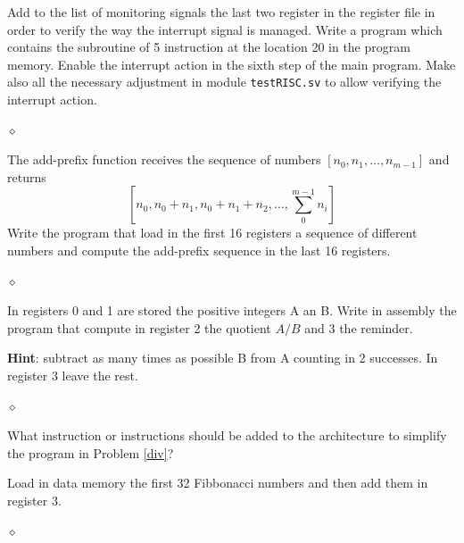 \begin{problem}
Add to the list of monitoring signals the last two register in the register file in order to verify the way the interrupt signal is managed. Write a program which contains the subroutine of 5 instruction at the location 20 in the program memory. Enable the interrupt action in the sixth step of the main program. Make also all the necessary adjustment in module {\tt testRISC.sv} to allow verifying the interrupt action.

$\diamond$
\end{problem}


\begin{problem}
The add-prefix function receives the sequence of numbers $[n_0, n_1, \ldots, n_{m-1}]$ and returns $$[n_0, n_0 + n_1, n_0 + n_1 + n_2, \ldots, \sum_0^{m-1} n_i]$$
Write the program that load in the first 16 registers a sequence of different numbers and compute the add-prefix sequence in the last 16 registers.

$\diamond$
\end{problem}


\begin{problem}\label{div}
In registers 0 and 1 are stored the positive integers A an B. Write in assembly the program that compute in register 2 the quotient $A / B$ and 3 the reminder.

{\bf Hint}: subtract as many times as possible B from A counting in 2 successes. In register 3 leave the rest.

$\diamond$
\end{problem}
What instruction or instructions should be added to the architecture to simplify the program in Problem \ref{div}?

\begin{problem}
Load in data memory the first 32 Fibbonacci numbers and then add them in register 3.


$\diamond$
\end{problem}








